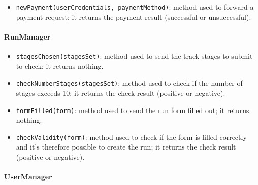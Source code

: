 \begin{itemize}
\item[ ]\texttt{newPayment(userCredentials, paymentMethod)}: method used to forward a payment request; it returns the payment result (successful or unsuccessful).
\end{itemize}

\paragraph*{RunManager}

\begin{itemize}
\item[ ]\texttt{stagesChosen(stagesSet)}: method used to send the track stages to submit to check; it returns nothing.

\item[ ]\texttt{checkNumberStages(stagesSet)}: method used to check if the number of stages exceeds 10; it returns the check result (positive or negative).

\item[ ]\texttt{formFilled(form)}: method used to send the run form filled out; it returns nothing.

\item[ ]\texttt{checkValidity(form)}: method used to check if the form is filled correctly and it's therefore possible to create the run; it returns the check result (positive or negative).
\end{itemize}

\paragraph*{UserManager}

